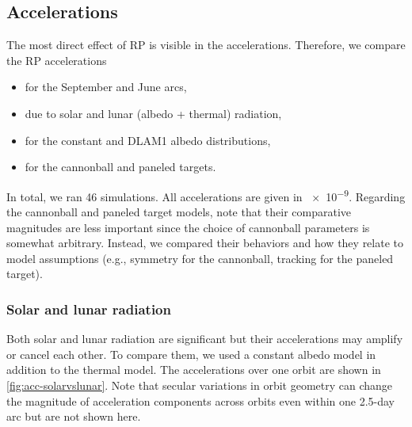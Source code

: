 \subsection{Accelerations}
The most direct effect of \gls{RP} is visible in the accelerations. Therefore, we compare the \gls{RP} accelerations
\begin{itemize}
    \item for the September and June arcs,
    \item due to solar and lunar (albedo + thermal) radiation,
    \item for the constant and \gls{DLAM1} albedo distributions,
    \item for the cannonball and paneled targets.
\end{itemize}
In total, we ran 46 simulations. All accelerations are given in \qty{e-9}{\acc}. Regarding the cannonball and paneled target models, note that their comparative magnitudes are less important since the choice of cannonball parameters is somewhat arbitrary. Instead, we compared their behaviors and how they relate to model assumptions (e.g., symmetry for the cannonball, tracking for the paneled target).


\subsubsection{Solar and lunar radiation}
Both solar and lunar radiation are significant but their accelerations may amplify or cancel each other. To compare them, we used a constant albedo model in addition to the thermal model. The accelerations over one orbit are shown in \cref{fig:acc-solarvslunar}. Note that secular variations in orbit geometry can change the magnitude of acceleration components across orbits even within one 2.5-day arc but are not shown here.

